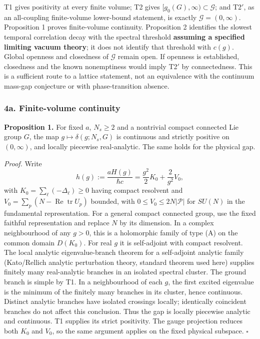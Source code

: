 \documentclass[11pt,a4paper]{article}
\begin{document}
T1 gives positivity at every finite volume; T2 gives
\([g_0(G),\infty)\subset\mathcal G\); and T2\('\), as an all-coupling
finite-volume lower-bound statement, is exactly
\(\mathcal G=(0,\infty)\). Proposition 1 proves finite-volume
continuity. Proposition 2 identifies the slowest temporal correlation
decay with the spectral threshold \textbf{assuming a specified limiting
vacuum theory}; it does not identify that threshold with \(c(g)\).
Global openness and closedness of \(\mathcal G\) remain open. If
openness is established, closedness and the known nonemptiness would
imply T2\('\) by connectedness. This is a sufficient route to a lattice
statement, not an equivalence with the continuum mass-gap conjecture or
with phase-transition absence.

\subsubsection{4a. Finite-volume
continuity}\label{a.-finite-volume-continuity}

\textbf{Proposition 1.} For fixed \(a\), \(N_s\ge2\) and a nontrivial
compact connected Lie group \(G\), the map \(g\mapsto\delta(g;N_s,G)\)
is continuous and strictly positive on \((0,\infty)\), and locally
piecewise real-analytic. The same holds for the physical gap.

\emph{Proof.} Write
\[h(g):=\frac{aH(g)}{\hbar c}=\frac{g^2}{2}K_0+\frac{2}{g^2}V_0,\] with
\(K_0=\sum_\ell(-\Delta_\ell)\ge0\) having compact resolvent and
\(V_0=\sum_p(N-\operatorname{Re}\operatorname{tr}U_p)\) bounded, with
\(0\le V_0\le2N|\mathcal P|\) for \(SU(N)\) in the fundamental
representation. For a general compact connected group, use the fixed
faithful representation and replace \(N\) by its dimension. In a complex
neighbourhood of any \(g>0\), this is a holomorphic family of type (A)
on the common domain \(D(K_0)\). For real \(g\) it is self-adjoint with
compact resolvent. The local analytic eigenvalue-branch theorem for a
self-adjoint analytic family (Kato/Rellich analytic perturbation theory,
standard theorem used here) supplies finitely many real-analytic
branches in an isolated spectral cluster. The ground branch is simple by
T1. In a neighbourhood of each \(g\), the first excited eigenvalue is
the minimum of the finitely many branches in its cluster, hence
continuous. Distinct analytic branches have isolated crossings locally;
identically coincident branches do not affect this conclusion. Thus the
gap is locally piecewise analytic and continuous. T1 supplies its strict
positivity. The gauge projection reduces both \(K_0\) and \(V_0\), so
the same argument applies on the fixed physical subspace. \(\square\)
\end{document}
